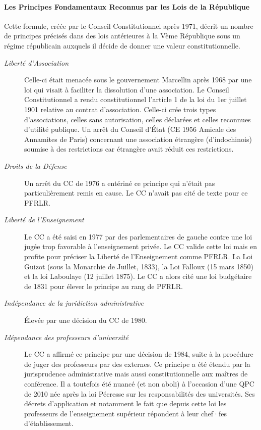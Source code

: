\documentclass[math]{cours}
\begin{document}
\paragraph{Les Principes Fondamentaux Reconnus par les Lois de la République}
Cette formule, créée par le Conseil Constitutionnel après 1971, décrit un nombre de principes précisés dans des lois antérieures à la Vème République sous un régime républicain auxquels il décide de donner une valeur constitutionnelle.
\begin{description}
	\item[\emph{Liberté d'Association}] Celle-ci était menacée sous le gouvernement Marcellin après 1968 par une loi qui visait à faciliter la dissolution d'une association.
	      Le Conseil Constitutionnel a rendu constitutionnel l'article 1 de la loi du 1er juillet 1901 relative au contrat d'association.
	      Celle-ci crée trois types d'associations, celles sans autorisation, celles déclarées et celles reconnues d'utilité publique.
	      Un arrêt du Conseil d'État (CE 1956 Amicale des Annamites de Paris) concernant une association étrangère (d'indochinois) soumise à des restrictions car étrangère avait réduit ces restrictions.
	\item[\emph{Droits de la Défense}] Un arrêt du CC de 1976 a entériné ce principe qui n'était pas particulièrement remis en cause.
	      Le CC n'avait pas cité de texte pour ce PFRLR.
	\item[\emph{Liberté de l'Enseignement}] Le CC a été saisi en 1977 par des parlementaires de gauche contre une loi jugée trop favorable à l'enseignement privée.
	      Le CC valide cette loi mais en profite pour préciser la Liberté de l'Enseignement comme PFRLR.
	      La Loi Guizot (sous la Monarchie de Juillet, 1833), la Loi Falloux (15 mars 1850) et la loi Laboulaye (12 juillet 1875).
	      Le CC a alors cité une loi budgétaire de 1831 pour élever le principe au rang de PFRLR.
	\item[\emph{Indépendance de la juridiction administrative}] Élevée par une décision du CC de 1980.
	\item[\emph{Idépendance des professeurs d'université}] Le CC a affirmé ce principe par une décision de 1984, suite à la procédure de juger des professeurs par des externes.
	      Ce principe a été étendu par la jurisprudence administrative mais aussi constitutionnelle aux maîtres de conférence.
	      Il a toutefois été nuancé (et non aboli) à l'occasion d'une QPC de 2010 née après la loi Pécresse sur les responsabilités des universités.
	      Ses décrets d'application et notamment le fait que depuis cette loi les professeurs de l'enseignement supérieur répondent à leur chef·fes d'établissement.

\end{description}
\end{document}
